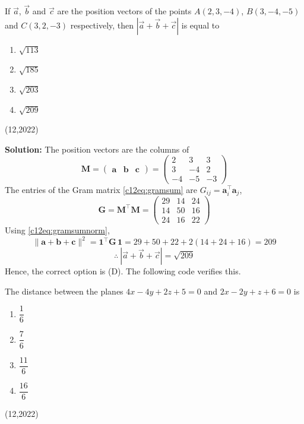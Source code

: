 \item If $\vec{a}$, $\vec{b}$ and $\vec{c}$ are the position vectors of the points $A(2, 3, -4)$, $B(3, -4, -5)$ and $C(3, 2, -3)$ respectively, then $|\vec{a} + \vec{b} + \vec{c}|$ is equal to
\begin{enumerate}[label=(\Alph*), noitemsep]
\item $\sqrt{113}$
\item $\sqrt{185}$
\item $\sqrt{203}$
\item $\sqrt{209}$
\end{enumerate}
\hfill (12,2022)

\textbf{Solution:} The position vectors are the columns of
\begin{equation}
\mathbf{M} = \begin{pmatrix} \mathbf{a} & \mathbf{b} & \mathbf{c} \end{pmatrix} = \begin{pmatrix} 2 & 3 & 3 \\ 3 & -4 & 2 \\ -4 & -5 & -3 \end{pmatrix}
\end{equation}
The entries of the Gram matrix \eqref{c12eq:gramsum} are $G_{ij} = \mathbf{a}_i^{\top}\mathbf{a}_j$,
\begin{equation}
\mathbf{G} = \mathbf{M}^{\top}\mathbf{M} = \begin{pmatrix} 29 & 14 & 24 \\ 14 & 50 & 16 \\ 24 & 16 & 22 \end{pmatrix}
\end{equation}
Using \eqref{c12eq:gramsumnorm},
\begin{equation}
\|\mathbf{a} + \mathbf{b} + \mathbf{c}\|^2 = \mathbf{1}^{\top}\mathbf{G}\,\mathbf{1} = 29 + 50 + 22 + 2(14 + 24 + 16) = 209
\end{equation}
\begin{equation}
\therefore\ |\vec{a} + \vec{b} + \vec{c}| = \sqrt{209}
\end{equation}
Hence, the correct option is (D). The following code verifies this.

\nopagebreak[4]
\begin{center}
\end{center}

\item The distance between the planes $4x - 4y + 2z + 5 = 0$ and $2x - 2y + z + 6 = 0$ is
\begin{enumerate}[label=(\Alph*), noitemsep]
\item $\dfrac{1}{6}$
\item $\dfrac{7}{6}$
\item $\dfrac{11}{6}$
\item $\dfrac{16}{6}$
\end{enumerate}
\hfill (12,2022)

